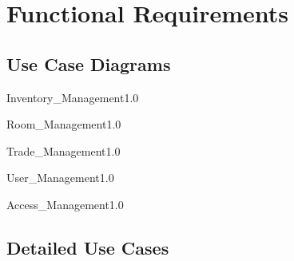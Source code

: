 \section{Functional Requirements}

\subsection{Use Case Diagrams}

\begin{myfigure}{Inventory_Management}{1.0}%
	\caption{Inventory Management}
	\label{fig:inventory-management}
\end{myfigure}

\begin{myfigure}{Room_Management}{1.0}%
	\caption{Room Management}
	\label{fig:room-management}
\end{myfigure}

\begin{myfigure}{Trade_Management}{1.0}%
	\caption{Trade Management}
	\label{fig:trade-management}
\end{myfigure}

\begin{myfigure}{User_Management}{1.0}%
	\caption{User Management}
	\label{fig:user-management}
\end{myfigure}

\begin{myfigure}{Access_Management}{1.0}%
	\caption{Access Management}
	\label{fig:access-management}
\end{myfigure}

\subsection{Detailed Use Cases}

\newpage
{}

\newpage
{}

\newpage
{}

\newpage